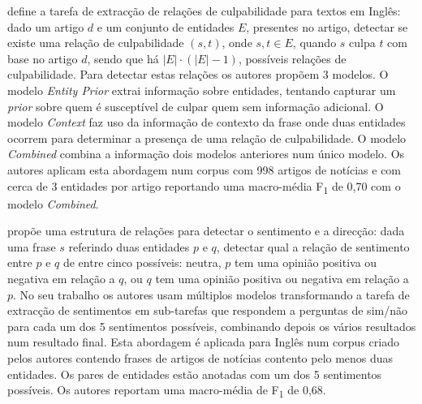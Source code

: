 \documentclass[a4paper, twocolumn, 11pt, twoside]{article}
\begin{document}
\cite{liang2019blames} define a tarefa de extracção de relações de culpabilidade para textos em Inglês: dado um artigo $d$ e um conjunto de entidades $E$, presentes no artigo, detectar se existe uma relação de culpabilidade $(s,t)$, onde $s,t \in E$, quando $s$ culpa $t$ com base no artigo $d$, sendo que há $\lvert{E}\rvert \cdot (\lvert{E}\rvert - 1)$, possíveis relações de culpabilidade. Para detectar estas relações os autores propõem 3 modelos. O modelo \textit{Entity Prior} extrai informação sobre entidades, tentando capturar um \textit{prior} sobre quem é susceptível de culpar quem sem informação adicional. O modelo \textit{Context} faz uso da informação de contexto da frase onde duas entidades ocorrem para determinar a presença de uma relação de culpabilidade. O modelo \textit{Combined} combina a informação dois modelos anteriores num único modelo. Os autores aplicam esta abordagem num corpus com 998 artigos de notícias e com cerca de 3 entidades por artigo reportando uma macro-média F\textsubscript{1} de 0,70 com o modelo \textit{Combined}.

\cite{park-etal-2021-blames} propõe uma estrutura de relações para detectar o sentimento e a direcção: dada uma frase $s$ referindo duas entidades $p$ e $q$, detectar qual a relação de sentimento entre $p$ e $q$ de entre cinco possíveis: neutra, $p$ tem uma opinião positiva ou negativa em relação a $q$, ou $q$ tem uma opinião positiva ou negativa em relação a $p$. No seu trabalho os autores usam múltiplos modelos transformando a tarefa de extracção de sentimentos em sub-tarefas que respondem a perguntas de sim/não para cada um dos 5 sentimentos possíveis, combinando depois os vários resultados num resultado final. Esta abordagem é aplicada para Inglês num corpus criado pelos autores contendo frases de artigos de notícias contento pelo menos duas entidades. Os pares de entidades estão anotadas com um dos 5 sentimentos possíveis. Os autores reportam uma macro-média de F\textsubscript{1} de 0,68.
\end{document}
